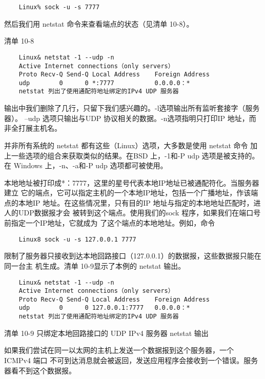 \begin{verbatim}
    Linux% sock -u -s 7777
\end{verbatim}

然后我们用 netstat 命令来查看端点的状态（见清单 10-8）。

清单 10-8

\begin{verbatim}
    Linux& netstat -1 --udp -n
    Active Internet connections（only servers）
    Proto Recv-Q Send-Q Local Address    Foreign Address
    udp        0      0 *:7777           0.0.0.0：*
    netstat 列出了使用通配符地址绑定的IPv4 UDP 服务器
\end{verbatim}

输出中我们删除了几行，只留下我们感兴趣的。-l选项输出所有监听套接字（服务器）。
--udp 选项只输出与UDP 协议相关的数据。-n选项指明只打印IP 地址，而非全打展主机名。

\begin{tcolorbox}
  并非所有系统的 netstat 都有这些（Linux）选项，大多数是使用 netstat 命令
  加上一些选项的组合来获取类似的结果。在BSD 上，-1和-P udp 选项是被支持的。
  在 Windows 上，-n、-a和-P udp 选项都可被使用。
\end{tcolorbox}

本地地址被打印成*：7777，这里的星号代表本地IP地址已被通配符化。当服务器建立
它的端点，它可以指定主机的一个本地IP地址，包括一个广播地址，作该端点的本地IP
地址。在这些情况里，只有目的IP 地址与指定的本地地址匹配时，进人的UDP数据报才会
被转到这个端点。使用我们的sock 程序，如果我们在端口号前指定一个IP地址，它就成为
了这个端点的本地地址。例如，命令

\begin{verbatim}
    Linux8 sock -u -s 127.0.0.1 7777
\end{verbatim}

限制了服务器只接收到达本地回路接口（127.0.0.1）的数据报，这些数据报只能在同一台主
机生成。清单 10-9显示了本例的 netstat 输出。

\begin{verbatim}
    Linux& netstat -1 --udp -n
    Active Internet connections（only servers）
    Proto Recv-Q Send-Q Local Address    Foreign Address
    udp        0      0 127.0.0.1:7777   0.0.0.0：*
    netstat 列出了使用通配符地址绑定的IPv4 UDP 服务器
\end{verbatim}
清单 10-9 只绑定本地回路接口的 UDP IPv4 服务器 netstat 输出

如果我们尝试在同一以太网的主机上发送一个数据报到这个服务器，一个 ICMPv4 端口
不可到达消息就会被返回，发送应用程序会接收到一个错误。服务器看不到这个数据报。

